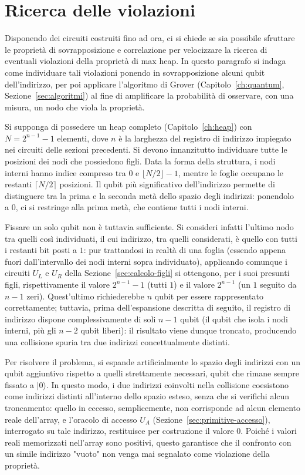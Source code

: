 \section{Ricerca delle violazioni \label{sec:ricerca-violazioni}}
Disponendo dei circuiti costruiti fino ad ora, ci si chiede se sia possibile sfruttare le proprietà di sovrapposizione e correlazione per velocizzare la ricerca di eventuali violazioni della proprietà di max heap. In questo paragrafo si indaga come individuare tali violazioni ponendo in sovrapposizione alcuni qubit dell'indirizzo, per poi applicare l'algoritmo di Grover (Capitolo~\ref{ch:quantum}, Sezione~\ref{sec:algoritmi}) al fine di amplificare la probabilità di osservare, con una misura, un nodo che viola la proprietà.

Si supponga di possedere un heap completo (Capitolo~\ref{ch:heap}) con $N = 2^{n-1}-1$ elementi, dove $n$ è la larghezza del registro di indirizzo impiegato nei circuiti delle sezioni precedenti. Si devono innanzitutto individuare tutte le posizioni dei nodi che possiedono figli. Data la forma della struttura, i nodi interni hanno indice compreso tra $0$ e $\lfloor N/2 \rfloor - 1$, mentre le foglie occupano le restanti $\lceil N/2 \rceil$ posizioni. Il qubit più significativo dell'indirizzo permette di distinguere tra la prima e la seconda metà dello spazio degli indirizzi: ponendolo a $0$, ci si restringe alla prima metà, che contiene tutti i nodi interni.

Fissare un solo qubit non è tuttavia sufficiente. Si consideri infatti l'ultimo nodo tra quelli così individuati, il cui indirizzo, tra quelli considerati, è quello con tutti i restanti bit posti a $1$: pur trattandosi in realtà di una foglia (essendo appena fuori dall'intervallo dei nodi interni sopra individuato), applicando comunque i circuiti $U_L$ e $U_R$ della Sezione~\ref{sec:calcolo-figli} si ottengono, per i suoi presunti figli, rispettivamente il valore $2^{n-1}-1$ (tutti $1$) e il valore $2^{n-1}$ (un $1$ seguito da $n-1$ zeri). Quest'ultimo richiederebbe $n$ qubit per essere rappresentato correttamente; tuttavia, prima dell'espansione descritta di seguito, il registro di indirizzo dispone complessivamente di soli $n-1$ qubit (il qubit che isola i nodi interni, più gli $n-2$ qubit liberi): il risultato viene dunque troncato, producendo una collisione spuria tra due indirizzi concettualmente distinti.

Per risolvere il problema, si espande artificialmente lo spazio degli indirizzi con un qubit aggiuntivo rispetto a quelli strettamente necessari, qubit che rimane sempre fissato a $|0\rangle$. In questo modo, i due indirizzi coinvolti nella collisione coesistono come indirizzi distinti all'interno dello spazio esteso, senza che si verifichi alcun troncamento: quello in eccesso, semplicemente, non corrisponde ad alcun elemento reale dell'array, e l'oracolo di accesso $U_A$ (Sezione~\ref{sec:primitive-accesso}), interrogato su tale indirizzo, restituisce per costruzione il valore $0$. Poiché i valori reali memorizzati nell'array sono positivi, questo garantisce che il confronto con un simile indirizzo "vuoto" non venga mai segnalato come violazione della proprietà.

